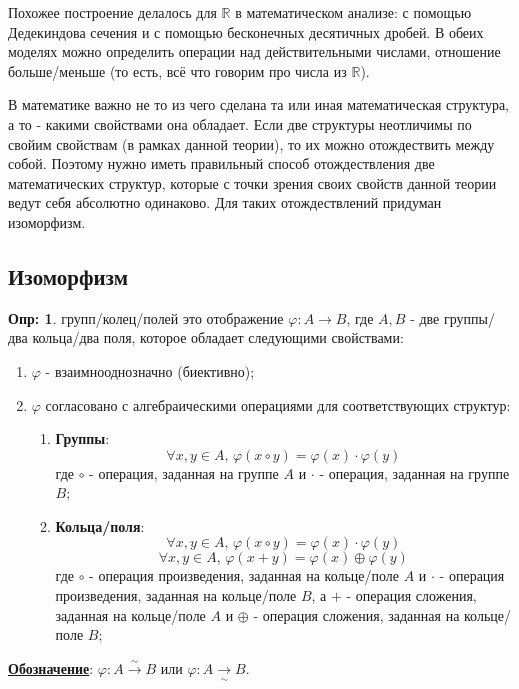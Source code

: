 \documentclass[12pt]{article}
\newcommand{\MR}{\mathbb{R}}
\theoremstyle{definition}
\newtheorem{defn}{Опр:}
\begin{document}
Похожее построение делалось для $\MR$ в математическом анализе: с помощью Дедекиндова сечения и с помощью бесконечных десятичных дробей. В обеих моделях можно определить операции над действительными числами, отношение больше/меньше (то есть, всё что говорим про числа из $\MR$). 

В математике важно не то из чего сделана та или иная математическая структура, а то - какими свойствами она обладает. Если две структуры неотличимы по свойим свойствам (в рамках данной теории), то их можно отождествить между собой. Поэтому нужно иметь правильный способ отождествления две математических структур, которые с точки зрения своих свойств данной теории ведут себя абсолютно одинаково. Для таких отождествлений придуман изоморфизм.

\newpage

\subsection*{Изоморфизм}
\begin{defn}
	 групп/колец/полей это отображение $\varphi \colon A \to B$, где $A,B$ - две группы/два кольца/два поля, которое обладает следующими свойствами:
	\begin{enumerate}[label =\arabic*)]
		\item $\varphi$ - взаимнооднозначно (биективно);
		\item $\varphi$ согласовано с алгебраическими операциями для соответствующих структур:
		\begin{enumerate}[label=(\alph*)]
			\item \textbf{Группы}: 
			$$
				\forall x,y \in A,\, \varphi(x \circ y) = \varphi(x){\cdot}\varphi(y) 
			$$
			где $\circ$ - операция, заданная на группе $A$ и $\cdot$ - операция, заданная на группе $B$;
			\item \textbf{Кольца/поля}:
			$$
				\forall x,y \in A,\, \varphi(x \circ y) = \varphi(x){\cdot}\varphi(y) 
			$$
			$$
				\forall x,y \in A, \, \varphi(x + y) = \varphi(x) \oplus \varphi(y)
			$$
			где $\circ$ - операция произведения, заданная на кольце/поле $A$ и $\cdot$ - операция произведения, заданная на кольце/поле $B$, а $+$ - операция сложения, заданная на кольце/поле $A$ и $\oplus$ - операция сложения, заданная на кольце/поле $B$;
		\end{enumerate}
	\end{enumerate}
	\textbf{\uline{Обозначение}}: $\varphi \colon A \xrightarrow[]{\sim} B$ или $\varphi \colon A \xrightarrow[\sim]{} B$.
\end{defn}
\end{document}
